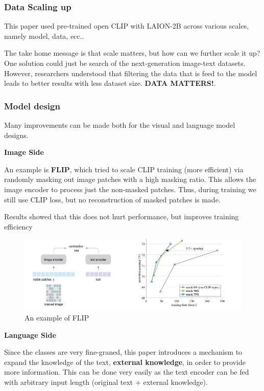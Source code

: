 \subsubsection{Data Scaling up}
This paper used pre-trained open CLIP with LAION-2B across various scales, namely model, data, ecc..

The take home message is that scale matters, but how can we further scale it up? One solution could just be search of the next-generation image-text datasets. However, researchers understood that filtering the data that is feed to the model leads to better results with less dataset size. \textbf{DATA MATTERS!}.

\subsubsection{Model design}
Many improvements can be made both for the visual and language model designs.

\textbf{Image Side}

An example is \textbf{FLIP}, which tried to scale CLIP training (more efficient) via randomly masking out image patches with a high masking ratio. This allows the image encoder to process just the non-masked patches. Thus, during training we still use CLIP loss, but no reconstruction of masked patches is made.

Results showed that this does not hurt performance, but improves training efficiency

\begin{figure}[H]
    \centering
    \includegraphics[width=1\linewidth]{tikz/FLIP.png}
    \caption{An example of FLIP}
    \label{fig:FLIP}
\end{figure}

\textbf{Language Side}

Since the classes are very fine-graned, this paper introduces a mechanism to expand the knowledge of the text, \textbf{external knowledge}, in order to provide more information. This can be done very easily as the text encoder can be fed with arbitrary input length (original text + external knowledge).


